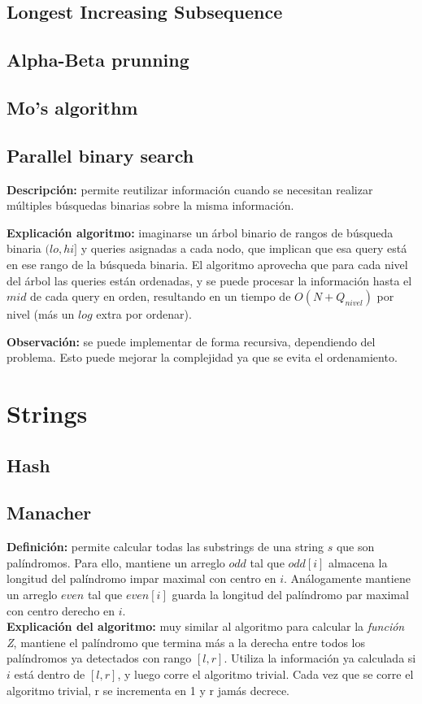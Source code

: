 \subsection{Longest Increasing Subsequence}
\subsection{Alpha-Beta prunning}
\subsection{Mo's algorithm}
\subsection{Parallel binary search}
\textbf{Descripción:} permite reutilizar información cuando se necesitan
realizar múltiples búsquedas binarias sobre la misma información.

\textbf{Explicación algoritmo:} imaginarse un árbol binario de rangos de
búsqueda binaria $(lo, hi]$ y queries asignadas a cada nodo, que implican que
esa query está en ese rango de la búsqueda binaria. El algoritmo aprovecha
que para cada nivel del árbol las queries están ordenadas, y se puede procesar
la información hasta el $mid$ de cada query en orden, resultando en un tiempo de
$O(N + Q_{nivel})$ por nivel (más un $log$ extra por ordenar). 

\textbf{Observación: } se puede implementar de forma recursiva, dependiendo del
problema. Esto puede mejorar la complejidad ya que se evita el ordenamiento.

\section{Strings}%
\subsection{Hash}
\subsection{Manacher}
\textbf{Definición:} permite calcular todas las substrings
de una string $s$ que son palíndromos.
Para ello, mantiene un arreglo $odd$ tal que $odd[i]$ 
almacena la longitud del palíndromo impar maximal con centro en $i$. 
Análogamente mantiene un arreglo $even$ tal que $even[i]$ guarda la 
longitud del palíndromo par maximal con centro derecho en $i$. \\
\textbf{Explicación del algoritmo:} muy similar al algoritmo para calcular
la \emph{función Z}, mantiene el palíndromo que termina más a la derecha
entre todos los palíndromos ya detectados con rango $[l, r]$. Utiliza la 
información ya calculada si $i$ está dentro de $[l, r]$, y luego corre
el algoritmo trivial. Cada vez que se corre el algoritmo trivial, r se 
incrementa en 1 y r jamás decrece.\\
